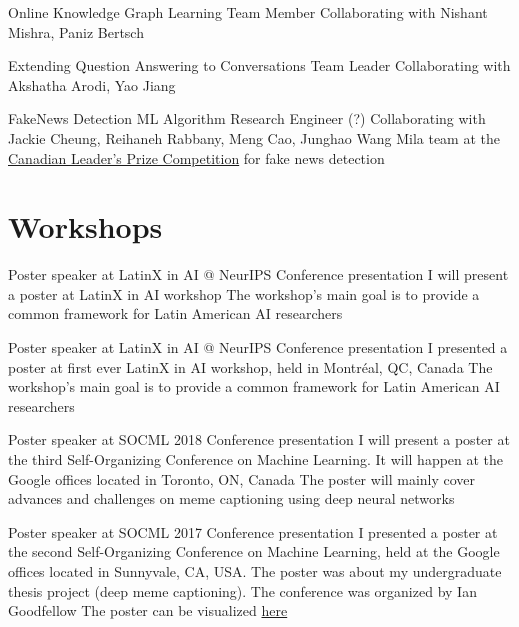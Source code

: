 \documentclass[8pt,a4paper,sans]{moderncv} %
\begin{document}
        {Online Knowledge Graph Learning}
        {Team Member}
        {Collaborating with Nishant Mishra, Paniz Bertsch}
        {}
        {}

        {Extending Question Answering to Conversations}
        {Team Leader}
        {Collaborating with Akshatha Arodi, Yao Jiang}
        {}
        {}

        {FakeNews Detection}
        {ML Algorithm Research Engineer (?)}
        {Collaborating with Jackie Cheung, Reihaneh Rabbany, Meng Cao, Junghao Wang}
        {Mila team at the \href{https://leadersprize.truenorthwaterloo.com/en/}{Canadian Leader's Prize Competition}
         for fake news detection}
        {}

\section{Workshops}

        {Poster speaker at LatinX in AI @ NeurIPS}
        {Conference presentation}
        {I will present a poster at LatinX in AI workshop}
        {The workshop's main goal is to provide a common framework for Latin American AI researchers}
        {}

        {Poster speaker at LatinX in AI @ NeurIPS}
        {Conference presentation}
        {I presented a poster at first ever LatinX in AI workshop, held in Montréal, QC, Canada}
        {The workshop's main goal is to provide a common framework for Latin American AI researchers}
        {}

        {Poster speaker at SOCML 2018}
        {Conference presentation}
        {I will present a poster at the third Self-Organizing Conference on Machine Learning. It will happen at the Google offices located in Toronto, ON, Canada}
        {The poster will mainly cover advances and challenges on meme captioning using deep neural networks}
        {}

        {Poster speaker at SOCML 2017}
        {Conference presentation}
        {I presented a poster at the second Self-Organizing Conference on Machine Learning, held at the Google offices located in Sunnyvale, CA, USA. The poster was about my undergraduate thesis project (deep meme captioning). The conference was organized by Ian Goodfellow}
        {The poster can be visualized \href{https://drive.google.com/file/d/1DPjqiXcmliwPZBOfBIXxnIX_rs9EPUub/view?usp=sharing}{here}}
        {}
\end{document}
